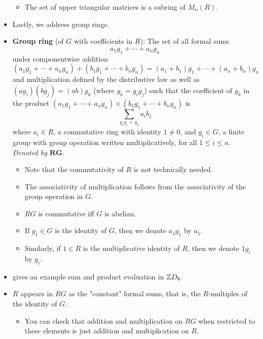 \documentclass[../notes.tex]{subfiles}
\begin{document}
\begin{itemize}
\begin{itemize}
        \item The set of upper triangular matrices is a subring of $M_n(R)$.
    \end{itemize}
    \item Lastly, we address group rings.
    \item \textbf{Group ring} (of $G$ with coefficients in $R$): The set of all formal sums
    \begin{equation*}
        a_1g_1+\cdots+a_ng_n
    \end{equation*}
    under componentwise addition
    \begin{equation*}
        (a_1g_1+\cdots+a_ng_n)+(b_1g_1+\cdots+b_ng_n) = (a_1+b_1)g_1+\cdots+(a_n+b_n)g_n
    \end{equation*}
    and multiplication defined by the distributive law as well as $(ag_i)(bg_j)=(ab)g_k$ (where $g_k=g_ig_j$) such that the coefficient of $g_k$ in the product $(a_1g_1+\cdots+a_ng_n)\times(b_1g_1+\cdots+b_ng_n)$ is
    \begin{equation*}
        \sum_{g_ig_j=g_k}a_ib_j
    \end{equation*}
    where $a_i\in R$, a commutative ring with identity $1\neq 0$, and $g_i\in G$, a finite group with group operation written multiplicatively, for all $1\leq i\leq n$. \emph{Denoted by} $\bm{RG}$.
    \begin{itemize}
        \item Note that the commutativity of $R$ is not technically needed.
        \item The associativity of multiplication follows from the associativity of the group operation in $G$.
        \item $RG$ is commutative iff $G$ is abelian.
        \item If $g_1\in G$ is the identity of $G$, then we denote $a_1g_1$ by $a_1$.
        \item Similarly, if $1\in R$ is the multiplicative identity of $R$, then we denote $1g_i$ by $g_i$.
    \end{itemize}
    \item \textcite{bib:DummitFoote} gives an example sum and product evaluation in $\mathbb{Z} D_8$.
    \item $R$ appears in $RG$ as the "constant" formal sums, that is, the $R$-multiples of the identity of $G$.
    \begin{itemize}
        \item You can check that addition and multiplication on $RG$ when restricted to these elements is just addition and multiplication on $R$.

\end{itemize}
\end{itemize}
\end{document}
